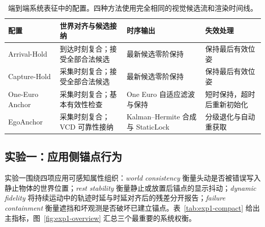 \documentclass[review]{vgtc}
\begin{document}
\begin{table}[t]
\centering
\caption{端到端系统表征中的配置。四种方法使用完全相同的视觉候选流和渲染时间线。}
\label{tab:configs}
\small
\begin{tabularx}{\textwidth}{lXXX}
\toprule
配置 & 世界对齐与候选接纳 & 时序输出 & 失效处理 \\
\midrule
Arrival-Hold & 到达时刻复合；接受全部合法候选 & 最新候选零阶保持 & 保持最后有效位姿 \\
Capture-Hold & 采集时刻复合；接受全部合法候选 & 最新候选零阶保持 & 保持最后有效位姿 \\
One-Euro Anchor & 采集时刻复合；基本有效性检查 & One Euro 自适应滤波与保持 & 短时保持，超时后重新初始化 \\
EgoAnchor & 采集时刻复合；VCD 可靠性接纳 & Kalman--Hermite 合成与 StaticLock & 分级退化与自动重获取 \\
\bottomrule
\end{tabularx}
\end{table}

\subsection{实验一：应用侧锚点行为}

实验一围绕四项应用可感知属性组织：\emph{world consistency} 衡量头动是否被错误写入静止物体的世界位置；\emph{rest stability} 衡量静止或放置后锚点的显示抖动；\emph{dynamic fidelity} 将持续运动中的轨迹时延与时延对齐后的残差分开报告；\emph{failure containment} 衡量遮挡和坏观测是否破坏已建立锚点。表~\ref{tab:exp1-compact} 给出主指标，图~\ref{fig:exp1-overview} 汇总三个最重要的系统权衡。
\end{document}
